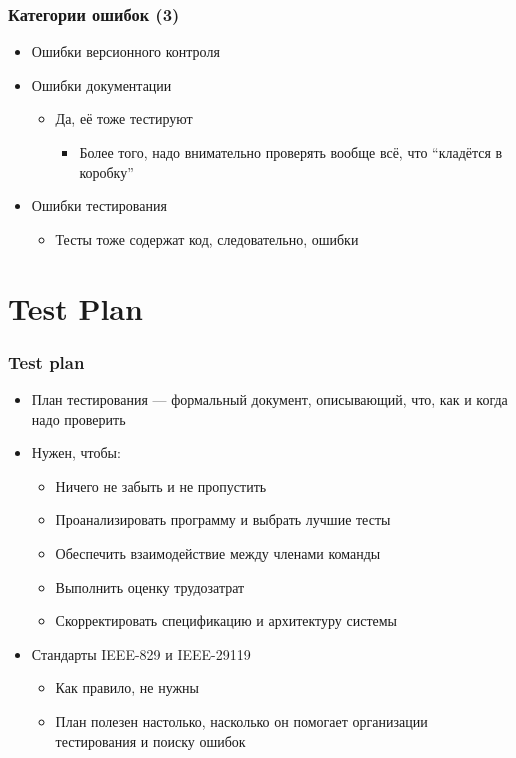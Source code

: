 \documentclass[xetex,mathserif,serif]{beamer}
\begin{document}
	\begin{frame}
		\frametitle{Категории ошибок (3)}
		\begin{itemize}
			\item Ошибки версионного контроля
			\item Ошибки документации
			\begin{itemize}
				\item Да, её тоже тестируют
				\begin{itemize}
					\item Более того, надо внимательно проверять вообще всё, что ``кладётся в коробку''
				\end{itemize}
			\end{itemize}
			\item Ошибки тестирования
			\begin{itemize}
				\item Тесты тоже содержат код, следовательно, ошибки
			\end{itemize}
		\end{itemize}
	\end{frame}

	\section{Test Plan}

	\begin{frame}
		\frametitle{Test plan}
		\begin{itemize}
			\item План тестирования --- формальный документ, описывающий, что, как и когда надо проверить
			\item Нужен, чтобы:
			\begin{itemize}
				\item Ничего не забыть и не пропустить
				\item Проанализировать программу и выбрать лучшие тесты
				\item Обеспечить взаимодействие между членами команды
				\item Выполнить оценку трудозатрат
				\item Скорректировать спецификацию и архитектуру системы
			\end{itemize}
			\item Стандарты IEEE-829 и IEEE-29119
			\begin{itemize}
				\item Как правило, не нужны
				\item План полезен настолько, насколько он помогает организации тестирования и поиску ошибок
			\end{itemize}
		\end{itemize}
	\end{frame}
\end{document}
